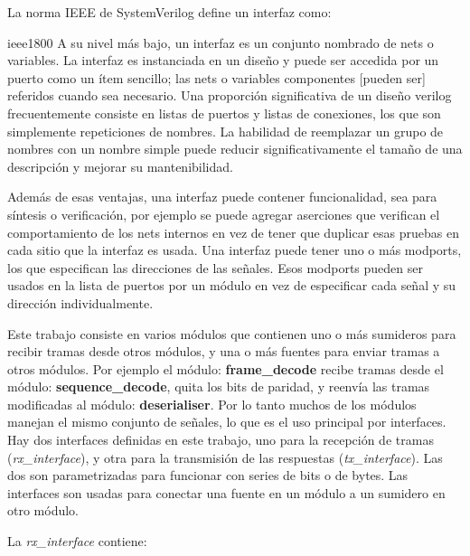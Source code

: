 \documentclass[a4paper, twoside, 11pt]{report}
\begin{document}
La norma IEEE de SystemVerilog define un interfaz como:

\begin{displaycquote}{ieee1800}
A su nivel más bajo, un interfaz es un conjunto nombrado de nets o variables. La interfaz es instanciada en un diseño y puede ser accedida por un puerto como un ítem sencillo; las nets o variables componentes [pueden ser] referidos cuando sea necesario. Una proporción significativa de un diseño verilog frecuentemente consiste en listas de puertos y listas de conexiones, los que son simplemente repeticiones de nombres. La habilidad de reemplazar un grupo de nombres con un nombre simple puede reducir significativamente el tamaño de una descripción y mejorar su mantenibilidad.
\end{displaycquote}

Además de esas ventajas, una interfaz puede contener funcionalidad, sea para síntesis o verificación, por ejemplo se puede agregar aserciones que verifican el comportamiento de los nets internos en vez de tener que duplicar esas pruebas en cada sitio que la interfaz es usada. Una interfaz puede tener uno o más modports, los que especifican las direcciones de las señales. Esos modports pueden ser usados en la lista de puertos por un módulo en vez de especificar cada señal y su dirección individualmente.

Este trabajo consiste en varios módulos que contienen uno o más sumideros para recibir tramas desde otros módulos, y una o más fuentes para enviar tramas a otros módulos. Por ejemplo el módulo: \textbf{frame\_decode} recibe tramas desde el módulo: \textbf{sequence\_decode}, quita los bits de paridad, y reenvía las tramas modificadas al módulo: \textbf{deserialiser}. Por lo tanto muchos de los módulos manejan el mismo conjunto de señales, lo que es el uso principal por interfaces. Hay dos interfaces definidas en este trabajo, uno para la recepción de tramas (\textit{rx\_interface}), y otra para la transmisión de las respuestas (\textit{tx\_interface}). Las dos son parametrizadas para funcionar con series de bits o de bytes. Las interfaces son usadas para conectar una fuente en un módulo a un sumidero en otro módulo.

La \textit{rx\_interface} contiene:
\end{document}
